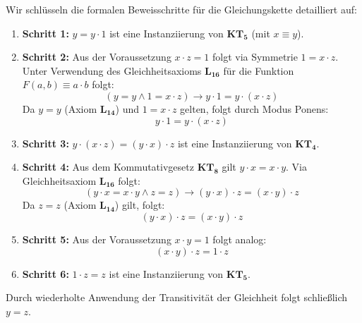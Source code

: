 \begin{math-stroke}
Wir schlüsseln die formalen Beweisschritte für die Gleichungskette detailliert auf:
\begin{enumerate}[label=\textbf{(\arabic*)}]
    \item \textbf{Schritt 1:} $y = y \cdot 1$ ist eine Instanziierung von $\mathbf{KT_5}$ (mit $x \equiv y$).
    \item \textbf{Schritt 2:} Aus der Voraussetzung $x \cdot z = 1$ folgt via Symmetrie $1 = x \cdot z$. Unter Verwendung des Gleichheitsaxioms $\mathbf{L_{16}}$ für die Funktion $F(a, b) \equiv a \cdot b$ folgt:
    \[ (y = y \wedge 1 = x \cdot z) \rightarrow y \cdot 1 = y \cdot (x \cdot z) \]
    Da $y = y$ (Axiom $\mathbf{L_{14}}$) und $1 = x \cdot z$ gelten, folgt durch Modus Ponens:
    \[ y \cdot 1 = y \cdot (x \cdot z) \]
    \item \textbf{Schritt 3:} $y \cdot (x \cdot z) = (y \cdot x) \cdot z$ ist eine Instanziierung von $\mathbf{KT_4}$.
    \item \textbf{Schritt 4:} Aus dem Kommutativgesetz $\mathbf{KT_8}$ gilt $y \cdot x = x \cdot y$. Via Gleichheitsaxiom $\mathbf{L_{16}}$ folgt:
    \[ (y \cdot x = x \cdot y \wedge z = z) \rightarrow (y \cdot x) \cdot z = (x \cdot y) \cdot z \]
    Da $z = z$ (Axiom $\mathbf{L_{14}}$) gilt, folgt:
    \[ (y \cdot x) \cdot z = (x \cdot y) \cdot z \]
    \item \textbf{Schritt 5:} Aus der Voraussetzung $x \cdot y = 1$ folgt analog:
    \[ (x \cdot y) \cdot z = 1 \cdot z \]
    \item \textbf{Schritt 6:} $1 \cdot z = z$ ist eine Instanziierung von $\mathbf{KT_5}$.
\end{enumerate}
Durch wiederholte Anwendung der Transitivität der Gleichheit folgt schließlich $y = z$.
\end{math-stroke}

